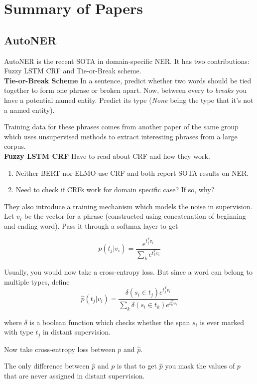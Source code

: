 \section{Summary of Papers}
\label{sec:summary}

\subsection{AutoNER}
AutoNER \cite{autoner} is the recent SOTA in domain-specific NER. It has two contributions: Fuzzy LSTM CRF and Tie-or-Break scheme.
\\

\noindent\textbf{Tie-or-Break Scheme}
In a sentence, predict whether two words should be tied together to form one phrase or broken apart. Now, between every to \textit{breaks} you have a potential named entity. Predict its type (\textit{None} being the type that it's not a named entity).

Training data for these phrases comes from another paper of the same group \cite{autophrase} which uses unsupervised methods to extract interesting phrases from a large corpus.
\\

\noindent\textbf{Fuzzy LSTM CRF}
Have to read about CRF and how they work. 
\begin{enumerate}
	\item Neither BERT nor ELMO use CRF and both report SOTA results on NER.
	\item Need to check if CRFs work for domain specific case? If so, why?
\end{enumerate}

They also introduce a training mechanism which models the noise in supervision.
Let $v_i$ be the vector for a phrase (constructed using concatenation of beginning and ending word). Pass it through a softmax layer to get 

\[
	p(t_j|v_i) = \frac{e^{t_j^Tv_i}}{\sum_{k}{e^{t_k^Tv_i}}}
\]

Usually, you would now take a cross-entropy loss. But since a word can belong to multiple types, define
\[
	\hat{p}(t_j|v_i) = \frac{\delta(s_i \in t_j) e^{t_j^Tv_i}}{\sum_{k}{\delta(s_i \in t_k)e^{t_k^Tv_i}}}
\]

where $\delta$ is a boolean function which checks whether the span $s_i$ is ever marked with type $t_j$ in distant supervision.

Now take cross-entropy loss between $p$ and $\hat{p}$.

The only difference between $\hat{p}$ and $p$ is that to get $\hat{p}$ you mask the values of $p$ that are never assigned in distant supervision. 

